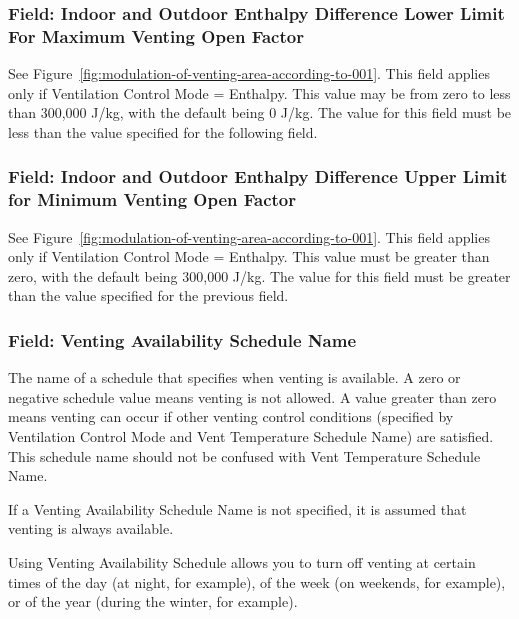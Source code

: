 \subsubsection{Field: Indoor and Outdoor Enthalpy Difference Lower Limit For Maximum Venting Open Factor}\label{field-indoor-and-outdoor-enthalpy-difference-lower-limit-for-maximum-venting-open-factor}

See Figure~\ref{fig:modulation-of-venting-area-according-to-001}. This field applies only if Ventilation Control Mode = Enthalpy. This value may be from zero to less than 300,000 J/kg, with the default being 0 J/kg. The value for this field must be less than the value specified for the following field.

\subsubsection{Field: Indoor and Outdoor Enthalpy Difference Upper Limit for Minimum Venting Open Factor}\label{field-indoor-and-outdoor-enthalpy-difference-upper-limit-for-minimum-venting-open-factor}

See Figure~\ref{fig:modulation-of-venting-area-according-to-001}. This field applies only if Ventilation Control Mode = Enthalpy. This value must be greater than zero, with the default being 300,000 J/kg. The value for this field must be greater than the value specified for the previous field.

\subsubsection{Field: Venting Availability Schedule Name}\label{field-venting-availability-schedule-name}

The name of a schedule that specifies when venting is available. A zero or negative schedule value means venting is not allowed. A value greater than zero means venting can occur if other venting control conditions (specified by Ventilation Control Mode and Vent Temperature Schedule Name) are satisfied. This schedule name should not be confused with Vent Temperature Schedule Name.

If a Venting Availability Schedule Name is not specified, it is assumed that venting is always available.

Using Venting Availability Schedule allows you to turn off venting at certain times of the day (at night, for example), of the week (on weekends, for example), or of the year (during the winter, for example).

